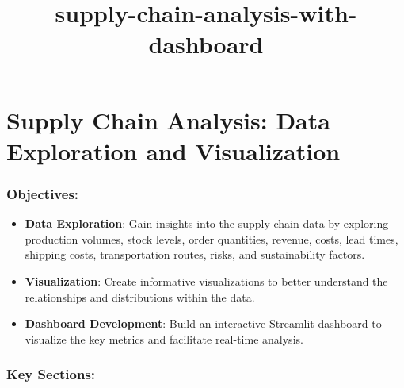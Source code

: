 \documentclass[11pt]{article}
\title{supply-chain-analysis-with-dashboard}
\providecommand{\tightlist}{%
      \setlength{\itemsep}{0pt}\setlength{\parskip}{0pt}}
\begin{document}
    
    \maketitle
    
    

    
    \section{Supply Chain Analysis: Data Exploration and
Visualization}\label{supply-chain-analysis-data-exploration-and-visualization}

\subsubsection{Objectives:}\label{objectives}

\begin{itemize}
\tightlist
\item
  \textbf{Data Exploration}: Gain insights into the supply chain data by
  exploring production volumes, stock levels, order quantities, revenue,
  costs, lead times, shipping costs, transportation routes, risks, and
  sustainability factors.
\item
  \textbf{Visualization}: Create informative visualizations to better
  understand the relationships and distributions within the data.
\item
  \textbf{Dashboard Development}: Build an interactive Streamlit
  dashboard to visualize the key metrics and facilitate real-time
  analysis.
\end{itemize}

\subsubsection{Key Sections:}\label{key-sections}
\end{document}
